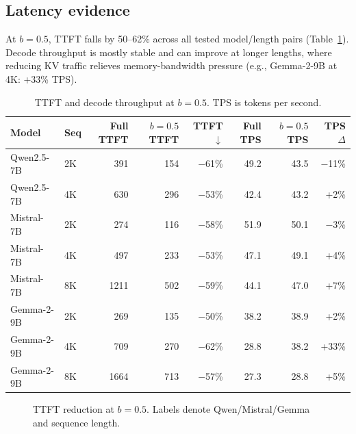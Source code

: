 \documentclass[11pt]{article}
\newcommand{\budget}{b}
\newcommand{\pct}{\%}
\theoremstyle{plain}
\theoremstyle{definition}
\begin{document}
\subsection{Latency evidence}
\label{sec:rq9}

At $\budget=0.5$, TTFT falls by 50--62\pct{} across all tested model/length pairs (Table~\ref{tab:latency}).  Decode throughput is mostly stable and can improve at longer lengths, where reducing KV traffic relieves memory-bandwidth pressure (e.g., Gemma-2-9B at 4K: +33\pct{} TPS).

\begin{table}[t]
\centering
\caption{TTFT and decode throughput at $\budget=0.5$.  TPS is tokens per second.}
\label{tab:latency}
\small
\begin{tabular}{llrrrrrr}
\toprule
Model & Seq & Full TTFT & $\budget=0.5$ TTFT & TTFT $\downarrow$ & Full TPS & $\budget=0.5$ TPS & TPS $\Delta$ \\
\midrule
Qwen2.5-7B & 2K & 391 & 154 & $-$61\pct{} & 49.2 & 43.5 & $-$11\pct{} \\
Qwen2.5-7B & 4K & 630 & 296 & $-$53\pct{} & 42.4 & 43.2 & +2\pct{} \\
Mistral-7B & 2K & 274 & 116 & $-$58\pct{} & 51.9 & 50.1 & $-$3\pct{} \\
Mistral-7B & 4K & 497 & 233 & $-$53\pct{} & 47.1 & 49.1 & +4\pct{} \\
Mistral-7B & 8K & 1211 & 502 & $-$59\pct{} & 44.1 & 47.0 & +7\pct{} \\
Gemma-2-9B & 2K & 269 & 135 & $-$50\pct{} & 38.2 & 38.9 & +2\pct{} \\
Gemma-2-9B & 4K & 709 & 270 & $-$62\pct{} & 28.8 & 38.2 & +33\pct{} \\
Gemma-2-9B & 8K & 1664 & 713 & $-$57\pct{} & 27.3 & 28.8 & +5\pct{} \\
\bottomrule
\end{tabular}
\end{table}

\begin{figure}[t]
\centering
{}
\caption{TTFT reduction at $\budget=0.5$.  Labels denote Qwen/Mistral/Gemma and sequence length.}
\label{fig:ttft}
\end{figure}
\end{document}
